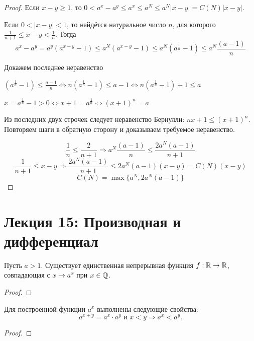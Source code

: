 	\begin{proof}
		Если $x - y \geqslant 1$, то $0 < a^x - a^y \leqslant a^x \leqslant a^N \leqslant a^N|x - y| = C(N)|x - y|$.
		
		Если $0 < |x - y| < 1$, то найдётся натуральное число $n$, для которого $\frac{1}{n + 1} \leqslant x - y < \frac{1}{n}$. Тогда
		\[ a^x - a^y = a^y(a^{x - y} - 1) \leqslant a^N(a^{x - y} - 1) \leqslant a^N(a^{\frac{1}{n}} - 1) \leqslant a^N \frac{(a - 1)}{n} \]
		\begin{explanation}
			Докажем последнее неравенство
			
			$(a^{\frac{1}{n}} - 1) \leqslant \frac{a - 1}{n} \Leftrightarrow n(a^{\frac{1}{n}} - 1) \leqslant a - 1 \Leftrightarrow n(a^{\frac{1}{n}} - 1) + 1 \leqslant a$
			
			$x = a^{\frac{1}{n}} - 1 > 0 \Leftrightarrow x + 1 = a^{\frac{1}{n}} \Leftrightarrow (x + 1)^n = a$
			
			Из последних двух строчек следует неравенство Бернулли: $nx + 1 \leqslant (x + 1)^n$. Повторяем шаги в обратную сторону и доказываем требуемое неравенство.
		\end{explanation}
		\[ \frac{1}{n} \leqslant \frac{2}{n + 1} \Rightarrow a^N \frac{(a - 1)}{n} \leqslant \frac{2a^N(a - 1)}{n + 1} \]
		\[ \frac{1}{n + 1} \leqslant x - y \Rightarrow \frac{2a^N(a - 1)}{n + 1} \leqslant 2a^N(a - 1)(x - y) = C(N)(x - y) \]
		\[ C(N) = \max\{a^N, 2a^N(a - 1)\} \]
	\end{proof}
	
	\newpage
	
	\section*{Лекция 15: Производная и дифференциал}
	
	\begin{theorem}
		Пусть $a > 1$. Существует единственная непрерывная функция $f : \mathbb R \rightarrow \mathbb R$, совпадающая с $x \mapsto a^x$ при $x \in \mathbb Q$.
	\end{theorem}
	
	\begin{proof}
	\end{proof}
	
	\begin{corollary}
		Для построенной функции $a^x$ выполнены следующие свойства:
		\[ a^{x + y} = a^x \cdot a^y \text{ и } x < y \Rightarrow a^x < a^y. \]
	\end{corollary}
	
	\begin{proof}
	\end{proof}
	
